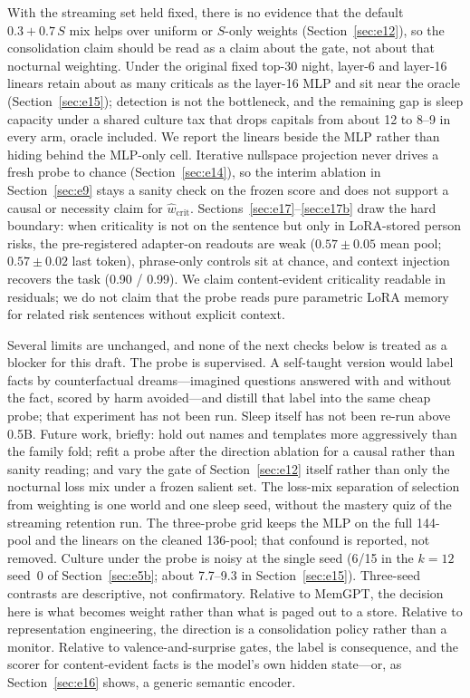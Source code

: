 \documentclass[11pt,a4paper]{article}
\begin{document}
With the streaming set held fixed, there is no evidence that the default $0.3{+}0.7\,S$ mix helps over uniform or $S$-only weights (Section~\ref{sec:e12}), so the consolidation claim should be read as a claim about the gate, not about that nocturnal weighting.
Under the original fixed top-30 night, layer-6 and layer-16 linears retain about as many criticals as the layer-16 MLP and sit near the oracle (Section~\ref{sec:e15}); detection is not the bottleneck, and the remaining gap is sleep capacity under a shared culture tax that drops capitals from about 12 to 8--9 in every arm, oracle included.
We report the linears beside the MLP rather than hiding behind the MLP-only cell.
Iterative nullspace projection never drives a fresh probe to chance (Section~\ref{sec:e14}), so the interim ablation in Section~\ref{sec:e9} stays a sanity check on the frozen score and does not support a causal or necessity claim for $\hat w_{\mathrm{crit}}$.
Sections~\ref{sec:e17}--\ref{sec:e17b} draw the hard boundary: when criticality is not on the sentence but only in LoRA-stored person risks, the pre-registered adapter-on readouts are weak ($0.57{\pm}0.05$ mean pool; $0.57{\pm}0.02$ last token), phrase-only controls sit at chance, and context injection recovers the task (0.90 / 0.99).
We claim content-evident criticality readable in residuals; we do not claim that the probe reads pure parametric LoRA memory for related risk sentences without explicit context.

Several limits are unchanged, and none of the next checks below is treated as a blocker for this draft.
The probe is supervised.
A self-taught version would label facts by counterfactual dreams---imagined questions answered with and without the fact, scored by harm avoided---and distill that label into the same cheap probe; that experiment has not been run.
Sleep itself has not been re-run above 0.5B.
Future work, briefly: hold out names and templates more aggressively than the family fold; refit a probe after the direction ablation for a causal rather than sanity reading; and vary the gate of Section~\ref{sec:e12} itself rather than only the nocturnal loss mix under a frozen salient set.
The loss-mix separation of selection from weighting is one world and one sleep seed, without the mastery quiz of the streaming retention run.
The three-probe grid keeps the MLP on the full 144-pool and the linears on the cleaned 136-pool; that confound is reported, not removed.
Culture under the probe is noisy at the single seed (6/15 in the $k{=}12$ seed~0 of Section~\ref{sec:e5b}; about 7.7--9.3 in Section~\ref{sec:e15}).
Three-seed contrasts are descriptive, not confirmatory.
Relative to MemGPT, the decision here is what becomes weight rather than what is paged out to a store.
Relative to representation engineering, the direction is a consolidation policy rather than a monitor.
Relative to valence-and-surprise gates, the label is consequence, and the scorer for content-evident facts is the model's own hidden state---or, as Section~\ref{sec:e16} shows, a generic semantic encoder.
\end{document}

